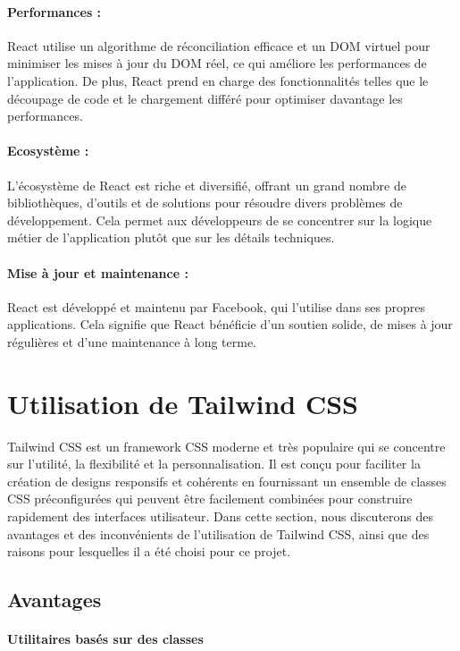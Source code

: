 \paragraph{Performances :} React utilise un algorithme de réconciliation efficace et un DOM virtuel pour minimiser les mises à jour du DOM réel, ce qui améliore les performances de l'application. De plus, React prend en charge des fonctionnalités telles que le découpage de code et le chargement différé pour optimiser davantage les performances.

\paragraph{Ecosystème :} L'écosystème de React est riche et diversifié, offrant un grand nombre de bibliothèques, d'outils et de solutions pour résoudre divers problèmes de développement. Cela permet aux développeurs de se concentrer sur la logique métier de l'application plutôt que sur les détails techniques.

\paragraph{Mise à jour et maintenance :} React est développé et maintenu par Facebook, qui l'utilise dans ses propres applications. Cela signifie que React bénéficie d'un soutien solide, de mises à jour régulières et d'une maintenance à long terme.

\section{Utilisation de Tailwind CSS}

Tailwind CSS est un framework CSS moderne et très populaire qui se concentre sur l'utilité, la flexibilité et la personnalisation. Il est conçu pour faciliter la création de designs responsifs et cohérents en fournissant un ensemble de classes CSS préconfigurées qui peuvent être facilement combinées pour construire rapidement des interfaces utilisateur. Dans cette section, nous discuterons des avantages et des inconvénients de l'utilisation de Tailwind CSS, ainsi que des raisons pour lesquelles il a été choisi pour ce projet.

\subsection{Avantages}

\paragraph{Utilitaires basés sur des classes}

